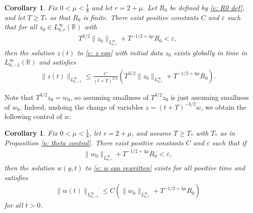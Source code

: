 \documentclass[11pt]{article}
\newcommand{\eps}{\varepsilon}
\newcommand{\R}{\mathbb{R}}
\newtheorem{corollary}[prop]{Corollary}
\numberwithin{equation}{section}
\numberwithin{prop}{section}
\begin{document}
\begin{corollary}
	Fix $0 < \mu < \frac{1}{8}$ and let $r = 2 + \mu$. Let $R_0$ be defined by \eqref{e: R0 def}, and let $T \geq T_*$ so that $R_0$ is finite. There exist positive constants $C$ and $\eps$ such that for all $z_0 \in L^\infty_{0, r} (\R)$ with 
	\begin{align}
	T^{3/2} \| z_0 \|_{L^\infty_{0,r}} + T^{-1/2 + 4 \mu} R_0 < \eps,
	\end{align}
	then the solution $z(t)$ to \eqref{e: z eqn} with initial data $z_0$ exists globally in time in $L^\infty_{0,-1}(\R)$ and satisfies
	\begin{align}
	\| z(t) \|_{L^\infty_{0, -1}} \leq \frac{C}{(t+T)^{3/2}} \left( T^{3/2} \|z_0 \|_{L^\infty_{0,r}} + T^{-1/2 + 4 \mu} R_0 \right). 
	\end{align}
\end{corollary}
Note that $T^{3/2} z_0 = w_0$, so assuming smallness of $T^{3/2} z_0$ is just assuming smallness of $w_0$. Indeed, undoing the change of variables $z = (t+T)^{-3/2} w$, we obtain the following control of $w$. 
\begin{corollary}\label{c: w control}
	Fix $0 < \mu < \frac{1}{8}$, let $r = 2 + \mu$, and assume $T \geq T_*$ with $T_*$ as in Proposition \ref{p: theta control}. There exist positive constants $C$ and $\eps$ such that if 
	\begin{align}
	\| w_0 \|_{L^\infty_{0, r}} + T^{-1/2+4\mu} R_0 < \eps,
	\end{align}
	then the solution $w(y,t)$ to \eqref{e: w eqn rewritten} exists for all positive time and satisfies
	\begin{align}
	\| w(t) \|_{L^\infty_{0, -1}} \leq C \left(\| w_0 \|_{L^\infty_{0, r}} + T^{-1/2 + 4 \mu} R_0 \right)
	\end{align}
	for all $t > 0$. 
\end{corollary}
\end{document}
